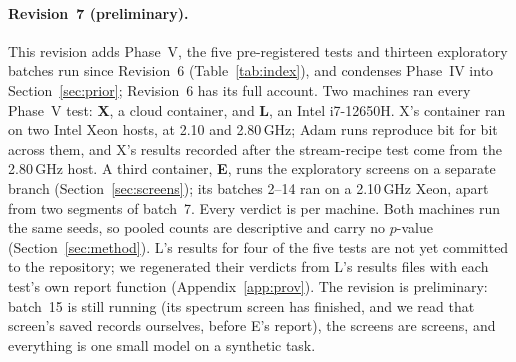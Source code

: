 \documentclass[11pt]{article}
\begin{document}
\paragraph{Revision~7 (preliminary).} This revision adds Phase~V, the five pre-registered tests and thirteen exploratory batches run since Revision~6 (Table~\ref{tab:index}), and condenses Phase~IV into Section~\ref{sec:prior}; Revision~6 has its full account. Two machines ran every Phase~V test: \textbf{X}, a cloud container, and \textbf{L}, an Intel i7-12650H. X's container ran on two Intel Xeon hosts, at 2.10 and 2.80\,GHz; Adam runs reproduce bit for bit across them, and X's results recorded after the stream-recipe test come from the 2.80\,GHz host. A third container, \textbf{E}, runs the exploratory screens on a separate branch (Section~\ref{sec:screens}); its batches 2--14 ran on a 2.10\,GHz Xeon, apart from two segments of batch~7. Every verdict is per machine. Both machines run the same seeds, so pooled counts are descriptive and carry no $p$-value (Section~\ref{sec:method}). L's results for four of the five tests are not yet committed to the repository; we regenerated their verdicts from L's results files with each test's own report function (Appendix~\ref{app:prov}). The revision is preliminary: batch~15 is still running (its spectrum screen has finished, and we read that screen's saved records ourselves, before E's report), the screens are screens, and everything is one small model on a synthetic task.
\end{document}
